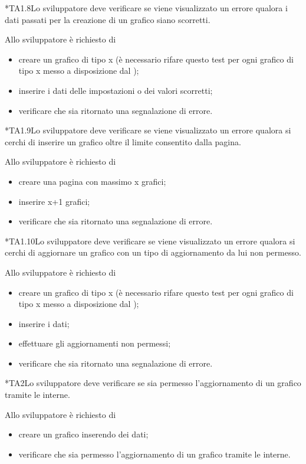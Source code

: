 	*{TA1.8}Lo sviluppatore deve verificare se viene visualizzato un errore qualora i dati passati per la creazione di un grafico siano scorretti.

		Allo sviluppatore è richiesto di
		\begin{itemize}
			\item creare un grafico di tipo x (è necessario rifare questo test per ogni grafico di tipo x messo a disposizione dal );
			\item inserire i dati delle impostazioni o dei valori scorretti;
			\item verificare che sia ritornato una segnalazione di errore.
		\end{itemize}

	*{TA1.9}Lo sviluppatore deve verificare se viene visualizzato un errore qualora si cerchi di inserire un grafico oltre il limite consentito dalla pagina.

		Allo sviluppatore è richiesto di
		\begin{itemize}
			\item creare una pagina con massimo x grafici;
			\item inserire x+1 grafici;
			\item verificare che sia ritornato una segnalazione di errore.
		\end{itemize}

	*{TA1.10}Lo sviluppatore deve verificare se viene visualizzato un errore qualora si cerchi di aggiornare un grafico con un tipo di aggiornamento da lui non permesso.

		Allo sviluppatore è richiesto di
		\begin{itemize}
			\item creare un grafico di tipo x (è necessario rifare questo test per ogni grafico di tipo x messo a disposizione dal );
			\item inserire i dati;
			\item effettuare gli aggiornamenti non permessi;
			\item verificare che sia ritornato una segnalazione di errore.
		\end{itemize}

	*{TA2}Lo sviluppatore deve verificare se sia permesso l'aggiornamento di un grafico tramite le  interne.
		
		Allo sviluppatore è richiesto di
		\begin{itemize}
			\item creare un grafico inserendo dei dati;
			\item verificare che sia permesso l'aggiornamento di un grafico tramite le  interne.
		\end{itemize}

